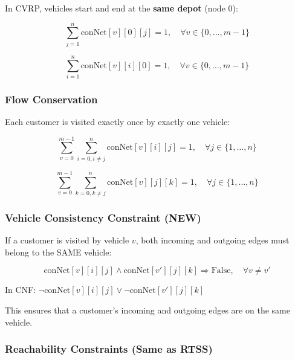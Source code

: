 \documentclass[12pt,a4paper]{article}
\theoremstyle{definition}
\begin{document}
In CVRP, vehicles start and end at the \textbf{same depot} (node 0):

\begin{equation}
\sum_{j=1}^{n} \text{conNet}[v][0][j] = 1, \quad \forall v \in \{0, \ldots, m-1\}
\tag{C1: Leave depot once}
\end{equation}

\begin{equation}
\sum_{i=1}^{n} \text{conNet}[v][i][0] = 1, \quad \forall v \in \{0, \ldots, m-1\}
\tag{C2: Return to depot once}
\end{equation}

\subsubsection{Flow Conservation}

Each customer is visited exactly once by exactly one vehicle:

\begin{equation}
\sum_{v=0}^{m-1} \sum_{i=0, i \neq j}^{n} \text{conNet}[v][i][j] = 1, \quad \forall j \in \{1, \ldots, n\}
\tag{C3: One entry per customer}
\end{equation}

\begin{equation}
\sum_{v=0}^{m-1} \sum_{k=0, k \neq j}^{n} \text{conNet}[v][j][k] = 1, \quad \forall j \in \{1, \ldots, n\}
\tag{C4: One exit per customer}
\end{equation}

\subsubsection{Vehicle Consistency Constraint (NEW)}

If a customer is visited by vehicle $v$, both incoming and outgoing edges must belong to the SAME vehicle:

\begin{equation}
\text{conNet}[v][i][j] \wedge \text{conNet}[v'][j][k] \Rightarrow \text{False}, \quad \forall v \neq v'
\tag{C5: Vehicle consistency}
\end{equation}

In CNF: $\neg\text{conNet}[v][i][j] \vee \neg\text{conNet}[v'][j][k]$

This ensures that a customer's incoming and outgoing edges are on the same vehicle.

\subsubsection{Reachability Constraints (Same as RTSS)}
\end{document}
